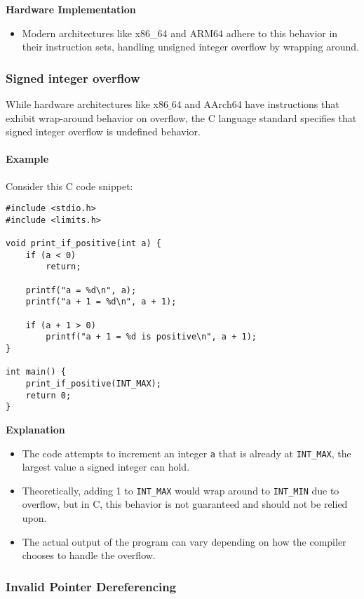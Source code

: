 \documentclass[12pt]{article}
\begin{document}
\textbf{Hardware Implementation}

\begin{itemize}
    \item Modern architectures like x86\_64 and ARM64 adhere to this behavior in their instruction sets, handling unsigned integer overflow by wrapping around.
\end{itemize}

\subsubsection{Signed integer overflow}

While hardware architectures like x86$\_$64 and AArch64 have instructions that exhibit wrap-around behavior on overflow, the C language standard specifies that signed integer overflow is undefined behavior.

\paragraph{Example}

Consider this C code snippet:

\begin{verbatim}
#include <stdio.h>
#include <limits.h>

void print_if_positive(int a) {
    if (a < 0)
        return;

    printf("a = %d\n", a);
    printf("a + 1 = %d\n", a + 1);

    if (a + 1 > 0)
        printf("a + 1 = %d is positive\n", a + 1);
}

int main() {
    print_if_positive(INT_MAX);
    return 0;
}
\end{verbatim}

\textbf{Explanation}
\begin{itemize}
    \item The code attempts to increment an integer \texttt{a} that is already at \texttt{INT\_MAX}, the largest value a signed integer can hold.
    \item Theoretically, adding 1 to \texttt{INT\_MAX} would wrap around to \texttt{INT\_MIN} due to overflow, but in C, this behavior is not guaranteed and should not be relied upon.
    \item The actual output of the program can vary depending on how the compiler chooses to handle the overflow.
\end{itemize}


\subsubsection{Invalid Pointer Dereferencing}
\end{document}
